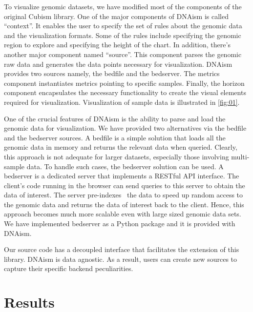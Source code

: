 \documentclass{bioinfo}
\begin{document}

To visualize genomic datasets, we have modified most of the components of the
original Cubism library. One of the major components of DNAism is called
“context”. It enables the user to specify the set of rules about the genomic
data and the visualization formats. Some of the rules include specifying the
genomic region to explore and specifying the height of the chart. In addition,
there’s another major component named “source”. This component parses the
genomic raw data and generates the data points necessary for visualization.
DNAism provides two sources namely, the bedfile and the bedserver. The metrics
component instantiates metrics pointing to specific samples. Finally, the
horizon component encapsulates the necessary functionality to create the
visual elements required for visualization. Visualization of sample data is
illustrated in \ref{fig:01}.

One of the crucial features of DNAism is the ability to parse and load the
genomic data for visualization. We have provided two alternatives via the
bedfile and the bedserver sources. A bedfile is a simple solution that loads
all the genomic data in memory and returns the relevant data when queried.
Clearly, this approach is not adequate for larger datasets, especially those
involving multi-sample data. To handle such cases, the bedserver solution can
be used. A bedserver is a dedicated server that implements a RESTful API
interface. The client's code running in the browser can send queries to this
server to obtain the data of interest. The server pre-indexes~\citep{tabix-li}
the data to speed up random access to the genomic data and returns the data of
interest back to the client. Hence, this approach becomes much more scalable
even with large sized genomic data sets. We have implemented bedserver as a
Python package and it is provided with DNAism.

Our source code has a decoupled interface that facilitates the extension of
this library. DNAism is data agnostic. As a result, users can create new
sources to capture their specific backend peculiarities.


\section{Results}
\end{document}
